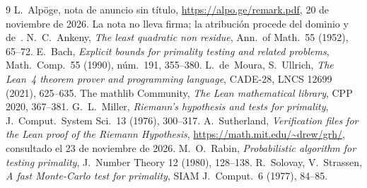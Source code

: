 \documentclass[11pt,a4paper]{amsart}
\theoremstyle{remark}
\begin{document}
\begin{thebibliography}{9}
 L.~Alp\"oge, nota de anuncio sin t\'itulo, \url{https://alpo.ge/remark.pdf}, 20 de noviembre de 2026. La nota no lleva firma; la atribuci\'on procede del dominio y de~\cite{MIT}.
 N.~C.~Ankeny, \emph{The least quadratic non residue}, Ann.\ of Math.\ 55 (1952), 65--72.
 E.~Bach, \emph{Explicit bounds for primality testing and related problems}, Math.\ Comp.\ 55 (1990), n\'um.~191, 355--380.
 L.~de~Moura, S.~Ullrich, \emph{The Lean~4 theorem prover and programming language}, CADE-28, LNCS 12699 (2021), 625--635.
 The mathlib Community, \emph{The Lean mathematical library}, CPP 2020, 367--381.
 G.~L.~Miller, \emph{Riemann's hypothesis and tests for primality}, J.\ Comput.\ System Sci.\ 13 (1976), 300--317.
 A.~Sutherland, \emph{Verification files for the Lean proof of the Riemann Hypothesis}, \url{https://math.mit.edu/~drew/grh/}, consultado el 23 de noviembre de 2026.
 M.~O.~Rabin, \emph{Probabilistic algorithm for testing primality}, J.\ Number Theory 12 (1980), 128--138.
 R.~Solovay, V.~Strassen, \emph{A fast Monte-Carlo test for primality}, SIAM J.\ Comput.\ 6 (1977), 84--85.
\end{thebibliography}
\end{document}
